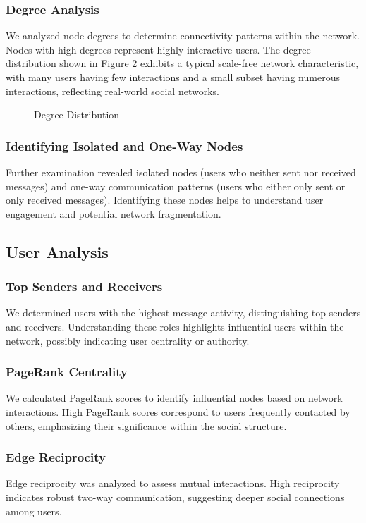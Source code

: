 \subsubsection{Degree Analysis}
We analyzed node degrees to determine connectivity patterns within the network. Nodes with high degrees represent highly interactive users. The degree distribution shown in Figure 2 exhibits a typical scale-free network characteristic, with many users having few interactions and a small subset having numerous interactions, reflecting real-world social networks.

\begin{figure}[h]
\centering
\caption{Degree Distribution}
\label{fig:degree_distribution}
\end{figure}

\subsubsection{Identifying Isolated and One-Way Nodes}
Further examination revealed isolated nodes (users who neither sent nor received messages) and one-way communication patterns (users who either only sent or only received messages). Identifying these nodes helps to understand user engagement and potential network fragmentation.

\subsection{User Analysis}

\subsubsection{Top Senders and Receivers}
We determined users with the highest message activity, distinguishing top senders and receivers. Understanding these roles highlights influential users within the network, possibly indicating user centrality or authority.

\subsubsection{PageRank Centrality}
We calculated PageRank scores to identify influential nodes based on network interactions. High PageRank scores correspond to users frequently contacted by others, emphasizing their significance within the social structure.

\subsubsection{Edge Reciprocity}
Edge reciprocity was analyzed to assess mutual interactions. High reciprocity indicates robust two-way communication, suggesting deeper social connections among users.

